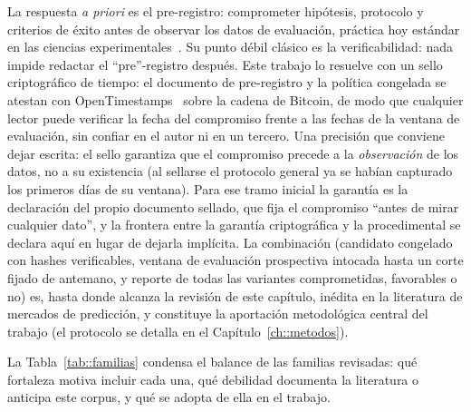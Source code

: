 La respuesta \emph{a priori} es el pre-registro: comprometer hipótesis, protocolo y
criterios de éxito antes de observar los datos de evaluación, práctica hoy estándar en
las ciencias experimentales~\cite{nosek2018preregistration}. Su punto débil clásico es
la verificabilidad: nada impide redactar el ``pre''-registro después. Este trabajo lo
resuelve con un sello criptográfico de tiempo: el documento de pre-registro y la
política congelada se atestan con OpenTimestamps~\cite{opentimestamps} sobre la cadena
de Bitcoin, de modo que cualquier lector puede verificar la fecha del compromiso frente a
las fechas de la ventana de evaluación, sin confiar en el autor ni en un tercero. Una
precisión que conviene dejar escrita: el sello garantiza que el compromiso precede a la
\emph{observación} de los datos, no a su existencia (al sellarse el protocolo general ya
se habían capturado los primeros días de su ventana). Para ese tramo inicial la garantía
es la declaración del propio documento sellado, que fija el compromiso ``antes de mirar
cualquier dato'', y la frontera entre la garantía criptográfica y la procedimental se
declara aquí en lugar de dejarla implícita. La
combinación (candidato congelado con hashes verificables, ventana de evaluación
prospectiva intocada hasta un corte fijado de antemano, y reporte de todas las variantes
comprometidas, favorables o no) es, hasta donde alcanza la revisión de este capítulo,
inédita en la literatura de mercados de predicción, y constituye la aportación
metodológica central del trabajo (el protocolo se detalla en el
Capítulo~\ref{ch::metodos}).

La Tabla~\ref{tab::familias} condensa el balance de las familias revisadas: qué fortaleza
motiva incluir cada una, qué debilidad documenta la literatura o anticipa este corpus, y
qué se adopta de ella en el trabajo.


